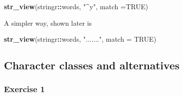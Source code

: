 \documentclass[]{book}
\newenvironment{Shaded}{\begin{snugshade}}{\end{snugshade}}
\newcommand{\DataTypeTok}[1]{\textcolor[rgb]{0.13,0.29,0.53}{#1}}
\newcommand{\KeywordTok}[1]{\textcolor[rgb]{0.13,0.29,0.53}{\textbf{#1}}}
\newcommand{\NormalTok}[1]{#1}
\newcommand{\OperatorTok}[1]{\textcolor[rgb]{0.81,0.36,0.00}{\textbf{#1}}}
\newcommand{\OtherTok}[1]{\textcolor[rgb]{0.56,0.35,0.01}{#1}}
\newcommand{\StringTok}[1]{\textcolor[rgb]{0.31,0.60,0.02}{#1}}
\theoremstyle{definition}
\theoremstyle{definition}
\theoremstyle{definition}
\theoremstyle{remark}
\begin{document}
\begin{Shaded}
\begin{Highlighting}[]
\KeywordTok{str_view}\NormalTok{(stringr}\OperatorTok{::}\NormalTok{words, }\StringTok{"^y"}\NormalTok{, }\DataTypeTok{match =}\OtherTok{TRUE}\NormalTok{)}
\end{Highlighting}
\end{Shaded}

\begin{Shaded}
\end{Shaded}

\begin{Shaded}
\end{Shaded}

A simpler way, shown later is

\begin{Shaded}
\end{Shaded}

\begin{Shaded}
\begin{Highlighting}[]
\KeywordTok{str_view}\NormalTok{(stringr}\OperatorTok{::}\NormalTok{words, }\StringTok{"......."}\NormalTok{, }\DataTypeTok{match =} \OtherTok{TRUE}\NormalTok{)}
\end{Highlighting}
\end{Shaded}

\hypertarget{character-classes-and-alternatives}{%
\subsection{Character classes and
alternatives}\label{character-classes-and-alternatives}}

\hypertarget{exercise-1-28}{%
\subsubsection{Exercise 1}\label{exercise-1-28}}
\end{document}
